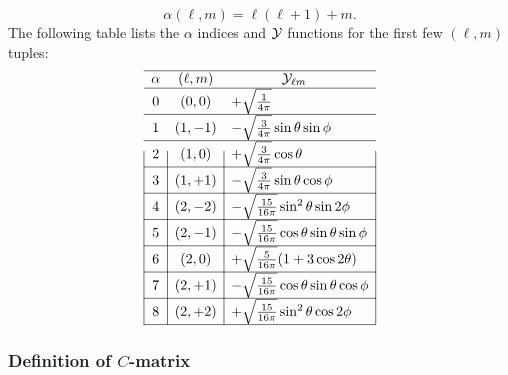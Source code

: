 \documentclass[letterpaper]{article}
\newcommand{\YY}{\mc Y}
\begin{document}
$$\alpha(\ell,m) = \ell(\ell + 1) + m. $$ 
The following table lists the $\alpha$ indices and 
$\YY$ functions for the first few $(\ell,m)$ tuples:
\renewcommand{\arraystretch}{2.0}
$$\begin{array}{|c|c|l|}\hline
\alpha & (\ell, m) & \hspace{0.5in} \YY_{\ell m}          \\\hline
0      & (   0, 0) & +\sqrt\frac{1}{4\pi} \\\hline
1      & (   1,-1) & -\sqrt{\frac{3}{4\pi}} \sin\theta\sin\phi  \\\hline
2      & (   1, 0) & +\sqrt\frac{3}{4\pi} \cos\theta          \\\hline
3      & (   1,+1) & -\sqrt{\frac{3}{4\pi}} \sin\theta\cos\phi  \\\hline
4      & (   2,-2) & -\sqrt\frac{15}{16\pi} \sin^2\theta \sin 2\phi \\ \hline
5      & (   2,-1) & -\sqrt\frac{15}{16\pi} \cos\theta \sin\theta \sin\phi \\ \hline
6      & (   2, 0) & +\sqrt\frac{5}{16\pi}(1+3\cos 2\theta) \\ \hline
7      & (   2,+1) & -\sqrt\frac{15}{16\pi} \cos\theta \sin\theta \cos\phi \\ \hline
8      & (   2,+2) & +\sqrt\frac{15}{16\pi} \sin^2\theta \cos 2\phi \\ \hline
\end{array}$$
\renewcommand{\arraystretch}{1.0}

\subsubsection*{Definition of $C$-matrix}
\end{document}
